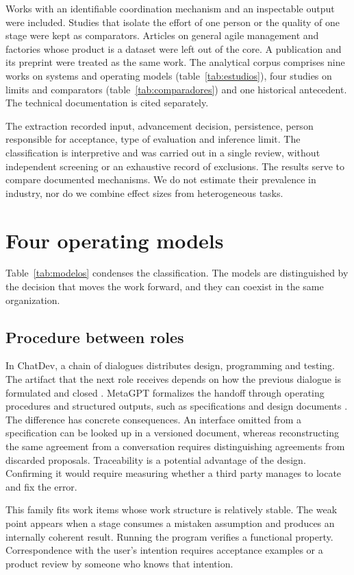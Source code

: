 \documentclass[11pt,a4paper]{article}
\begin{document}
Works with an identifiable coordination mechanism and an inspectable output were included. Studies that isolate the effort of one person or the quality of one stage were kept as comparators. Articles on general agile management and factories whose product is a dataset were left out of the core. A publication and its preprint were treated as the same work. The analytical corpus comprises nine works on systems and operating models (table~\ref{tab:estudios}), four studies on limits and comparators (table~\ref{tab:comparadores}) and one historical antecedent. The technical documentation is cited separately.

The extraction recorded input, advancement decision, persistence, person responsible for acceptance, type of evaluation and inference limit. The classification is interpretive and was carried out in a single review, without independent screening or an exhaustive record of exclusions. The results serve to compare documented mechanisms. We do not estimate their prevalence in industry, nor do we combine effect sizes from heterogeneous tasks.

\section{Four operating models}
Table~\ref{tab:modelos} condenses the classification. The models are distinguished by the decision that moves the work forward, and they can coexist in the same organization.
\subsection{Procedure between roles}
In ChatDev, a chain of dialogues distributes design, programming and testing. The artifact that the next role receives depends on how the previous dialogue is formulated and closed \citep{chatdev}. MetaGPT formalizes the handoff through operating procedures and structured outputs, such as specifications and design documents \citep{metagpt}. The difference has concrete consequences. An interface omitted from a specification can be looked up in a versioned document, whereas reconstructing the same agreement from a conversation requires distinguishing agreements from discarded proposals. Traceability is a potential advantage of the design. Confirming it would require measuring whether a third party manages to locate and fix the error.

This family fits work items whose work structure is relatively stable. The weak point appears when a stage consumes a mistaken assumption and produces an internally coherent result. Running the program verifies a functional property. Correspondence with the user's intention requires acceptance examples or a product review by someone who knows that intention.
\end{document}
